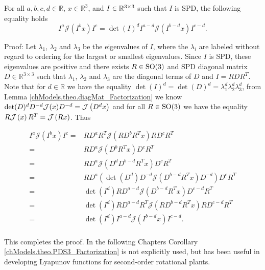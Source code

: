 \begin{PDS3_Factorization}
\label{chModels.theo.PDS3_Factorization}
For all $a,b,c,d\in\mathbb{R}$, $x\in\mathbb{R}^3$, and 
$I\in\mathbb{R}^{3\times 3}$ such that $I$ is \ac{SPD}, the following
equality holds
%
\begin{equation}
\label{chModels.eq.PDS3_Factorization}
I^a\mathcal{J}\left(I^b x\right)I^c=\det(I)^d I^{a-d}\mathcal{J}
\left(I^{b-d} x\right)I^{c-d}.
\end{equation}
%
\end{PDS3_Factorization}
%
Proof: Let $\lambda_1$, $\lambda_2$ and $\lambda_3$ be the eigenvalues
of $I$, where the $\lambda_i$ are labeled without regard to ordering
for the largest or smallest eigenvalues. Since $I$ is \ac{SPD}, these
eigenvalues are positive and there exists $R\in\SO3$ and \ac{SPD}
diagonal matrix $D\in\mathbb{R}^{3 \times 3}$ such that $\lambda_1$,
$\lambda_2$ and $\lambda_3$ are the diagonal terms of $D$ and
$I=RDR^T$. Note that for $d\in\mathbb{R}$ we have the equality
$\det(I)^d=\det(D)^d=\lambda_1^d\lambda_2^d\lambda_3^d$, from Lemma
\ref{chModels.theo.diagMat_Factorization} we know $\det(D)^d
D^{-d}\mathcal{J}(x) D^{-d}=\mathcal{J}\left( D^d x \right)$ and for all $R\in\SO3$
we have the equality $R\mathcal{J}\left( x \right)R^T=\mathcal{J}\left( Rx \right)$. Thus

\begin{align}
I^a\mathcal{J}\left(I^b x\right)I^c
  =& RD^aR^T\mathcal{J}\left(RD^bR^T x\right)RD^cR^T
\nonumber \\
  =& RD^a\mathcal{J}\left(D^bR^T x\right)D^cR^T
\nonumber \\
  =& RD^a\mathcal{J}\left(D^dD^{b-d}R^T x\right)D^cR^T
\nonumber \\
  =& RD^a\left(\det\left(D^d\right)D^{-d}\mathcal{J}\left(D^{b-d}R^T x\right)D^{-d}\right)D^cR^T
\nonumber \\
  =&\det\left(I^d\right) RD^{a-d}\mathcal{J}\left(D^{b-d}R^T x\right)D^{c-d}R^T
\nonumber \\
  =&\det\left(I^d\right) RD^{a-d}R^T\mathcal{J}\left(R D^{b-d}R^T x\right)RD^{c-d}R^T
\nonumber \\
  =&\det\left(I^d\right) I^{a-d}\mathcal{J}\left(I^{b-d} x\right)I^{c-d}.
\nonumber \\
\end{align}

This completes the proof. In the following Chapters Corollary
\ref{chModels.theo.PDS3_Factorization} is not explicitly used, but has
been useful in developing Lyapunov functions for second-order
rotational plants.
